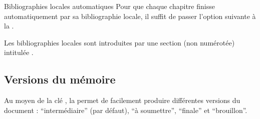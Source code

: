 \begin{dbexample}{Bibliographies locales automatiques}{}
  Pour que chaque chapitre finisse automatiquement par sa bibliographie locale,
  il suffit de passer l'option suivante à la \yatCl{}.
\end{dbexample}

Les bibliographies locales sont introduites par une section (non numérotée)
intitulée .

\subsection{Versions du mémoire}\label{sec-versions}
%

Au moyen de la clé , la \yatCl{} permet de facilement produire
différentes versions du document : \enquote{intermédiaire} (par défaut),
\enquote{à soumettre}, \enquote{finale} et \enquote{brouillon}.

